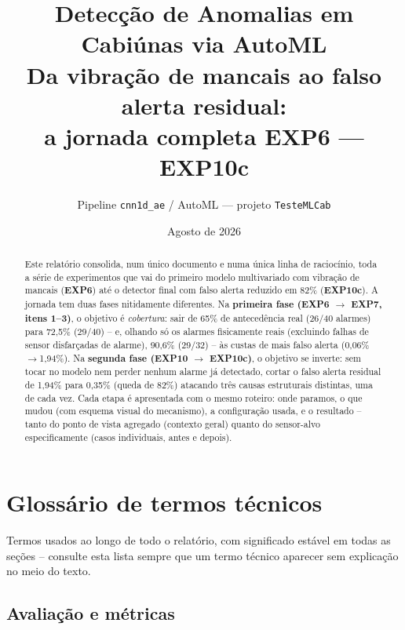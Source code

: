 \documentclass[11pt,a4paper]{article}
\title{Detecção de Anomalias em Cabiúnas via AutoML\\
\large Da vibração de mancais ao falso alerta residual:\\
a jornada completa EXP6 --- EXP10c}
\author{Pipeline \texttt{cnn1d\_ae} / AutoML --- projeto \texttt{TesteMLCab}}
\date{Agosto de 2026}
\begin{document}
\maketitle

\begin{abstract}
Este relatório consolida, num único documento e numa única linha de
raciocínio, toda a série de experimentos que vai do primeiro modelo
multivariado com vibração de mancais (\textbf{EXP6}) até o detector final
com falso alerta reduzido em 82\% (\textbf{EXP10c}). A jornada tem duas
fases nitidamente diferentes. Na \textbf{primeira fase (EXP6 $\to$ EXP7,
itens 1--3)}, o objetivo é \emph{cobertura}: sair de 65\% de antecedência
real (26/40 alarmes) para 72,5\% (29/40) -- e, olhando só os alarmes
fisicamente reais (excluindo falhas de sensor disfarçadas de alarme),
90,6\% (29/32) -- às custas de mais falso alerta (0,06\%$\to$1,94\%). Na
\textbf{segunda fase (EXP10 $\to$ EXP10c)}, o objetivo se inverte: sem
tocar no modelo nem perder nenhum alarme já detectado, cortar o falso
alerta residual de 1,94\% para 0,35\% (queda de 82\%) atacando três causas
estruturais distintas, uma de cada vez. Cada etapa é apresentada com o
mesmo roteiro: onde paramos, o que mudou (com esquema visual do
mecanismo), a configuração usada, e o resultado -- tanto do ponto de vista
agregado (contexto geral) quanto do sensor-alvo especificamente (casos
individuais, antes e depois).
\end{abstract}

\tableofcontents
\clearpage

\section*{Glossário de termos técnicos}
\label{sec:glossario}

Termos usados ao longo de todo o relatório, com significado estável em
todas as seções -- consulte esta lista sempre que um termo técnico
aparecer sem explicação no meio do texto.

\subsection*{Avaliação e métricas}
\end{document}

